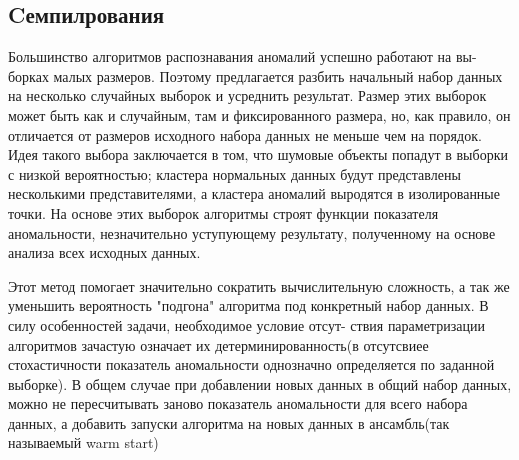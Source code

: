 \subsection{Cемпилрования}
Большинство алгоритмов распознавания аномалий успешно работают на вы-
борках малых размеров. Поэтому предлагается разбить начальный набор данных на несколько случайных выборок и усреднить результат. Размер этих выборок может быть как и случайным, там и фиксированного размера, но, как правило, он отличается от размеров исходного набора данных не меньше чем на порядок. Идея такого выбора заключается в том, что шумовые объекты попадут в выборки с низкой вероятностью; кластера нормальных данных будут представлены несколькими представителями, а кластера аномалий выродятся в изолированные точки. На основе этих выборок алгоритмы строят функции показателя аномальности, незначительно уступующему результату, полученному на основе анализа всех исходных данных. 

Этот метод помогает значительно сократить вычислительную сложность, а так же уменьшить вероятность "подгона" алгоритма под конкретный набор данных.  В силу особенностей задачи, необходимое условие отсут-
ствия параметризации алгоритмов зачастую означает их детерминированность(в отсутсвиее стохастичности показатель аномальности однозначно определяется по  заданной выборке). В общем случае при добавлении новых данных в общий набор данных, можно не пересчитывать заново показатель аномальности для всего набора данных, а добавить запуски алгоритма на новых данных в ансамбль(так называемый warm start\cite{Book15})
